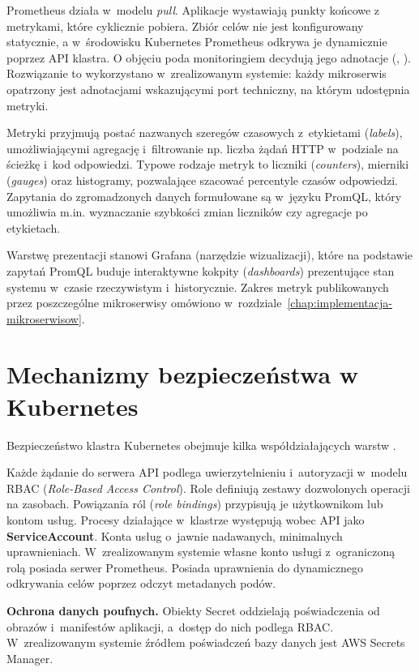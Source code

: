 Prometheus działa w~modelu \emph{pull}. Aplikacje wystawiają punkty końcowe z metrykami, które cyklicznie pobiera.
Zbiór celów nie jest konfigurowany statycznie, a w~środowisku Kubernetes Prometheus odkrywa je dynamicznie poprzez API klastra.
O objęciu poda monitoringiem decydują jego adnotacje (, ).
Rozwiązanie to wykorzystano w~zrealizowanym systemie: każdy mikroserwis opatrzony jest adnotacjami wskazującymi 
port techniczny, na którym udostępnia metryki.

Metryki przyjmują postać nazwanych szeregów czasowych z~etykietami (\emph{labels}), umożliwiającymi agregację
i~filtrowanie np. liczba żądań HTTP w~podziale na ścieżkę i~kod odpowiedzi. Typowe rodzaje metryk to liczniki
(\emph{counters}), mierniki (\emph{gauges}) oraz histogramy, pozwalające szacować percentyle czasów odpowiedzi.
Zapytania do zgromadzonych danych formułowane są w~języku PromQL, który umożliwia m.in. wyznaczanie szybkości
zmian liczników czy agregacje po etykietach.

Warstwę prezentacji stanowi Grafana (narzędzie wizualizacji), które na podstawie zapytań PromQL buduje
interaktywne kokpity (\emph{dashboards}) prezentujące stan systemu w~czasie rzeczywistym i~historycznie.
Zakres metryk publikowanych przez poszczególne mikroserwisy omówiono w~rozdziale~\ref{chap:implementacja-mikroserwisow}.

\section{Mechanizmy bezpieczeństwa w Kubernetes}
\label{sec:bezpieczenstwo-kubernetes}

Bezpieczeństwo klastra Kubernetes obejmuje kilka współdziałających warstw \parencite{k8sdocs}.

Każde żądanie do serwera API podlega uwierzytelnieniu i~autoryzacji w~modelu RBAC (\emph{Role-Based Access Control}).
Role definiują zestawy dozwolonych operacji na zasobach. Powiązania ról (\emph{role bindings}) przypisują je użytkownikom lub kontom usług.
Procesy działające w~klastrze występują wobec API jako \textbf{ServiceAccount}. Konta usług o~jawnie nadawanych,
minimalnych uprawnieniach. W~zrealizowanym systemie własne konto usługi z~ograniczoną rolą posiada serwer
Prometheus. Posiada uprawnienia do dynamicznego odkrywania celów poprzez odczyt metadanych podów.

\textbf{Ochrona danych poufnych.} Obiekty Secret oddzielają poświadczenia od obrazów i~manifestów aplikacji,
a~dostęp do nich podlega RBAC. W~zrealizowanym systemie źródłem poświadczeń bazy danych jest AWS Secrets Manager.

